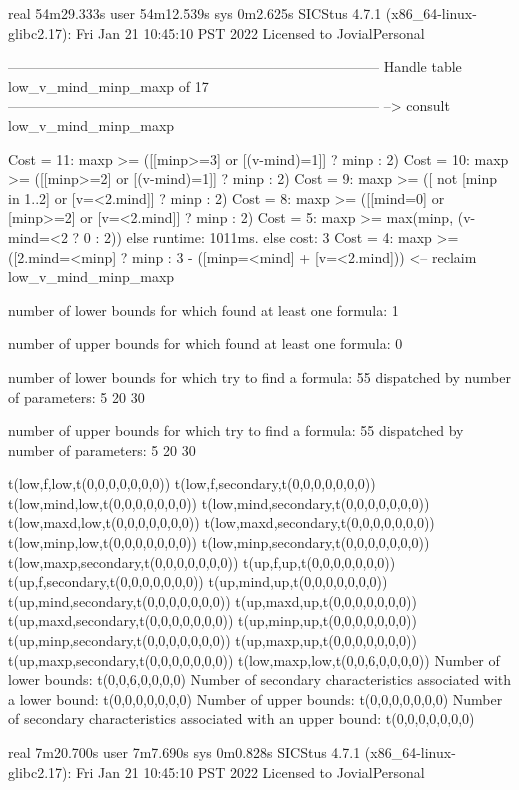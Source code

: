 real	54m29.333s
user	54m12.539s
sys	0m2.625s
SICStus 4.7.1 (x86_64-linux-glibc2.17): Fri Jan 21 10:45:10 PST 2022
Licensed to JovialPersonal


--------------------------------------------------------------------------------
Handle table low_v_mind_minp_maxp of 17
--------------------------------------------------------------------------------
--> consult low_v_mind_minp_maxp

Cost = 11:  maxp >= ([[minp>=3] or [(v-mind)=1]] ? minp : 2)
Cost = 10:  maxp >= ([[minp>=2] or [(v-mind)=1]] ? minp : 2)
Cost =  9:  maxp >= ([ not [minp in 1..2] or [v=<2.mind]] ? minp : 2)
Cost =  8:  maxp >= ([[mind=0] or [minp>=2] or [v=<2.mind]] ? minp : 2)
Cost =  5:  maxp >= max(minp, (v-mind=<2 ? 0 : 2)) %
else runtime: 1011ms. else cost: 3
Cost =  4:  maxp >= ([2.mind=<minp] ? minp : 3 - ([minp=<mind] + [v=<2.mind])) %
<-- reclaim low_v_mind_minp_maxp

number of lower bounds for which found at least one formula: 1

number of upper bounds for which found at least one formula: 0

number of lower bounds for which try to find a formula: 55
dispatched by number of parameters: 5  20  30

number of upper bounds for which try to find a formula: 55
dispatched by number of parameters: 5  20  30

t(low,f,low,t(0,0,0,0,0,0,0))
t(low,f,secondary,t(0,0,0,0,0,0,0))
t(low,mind,low,t(0,0,0,0,0,0,0))
t(low,mind,secondary,t(0,0,0,0,0,0,0))
t(low,maxd,low,t(0,0,0,0,0,0,0))
t(low,maxd,secondary,t(0,0,0,0,0,0,0))
t(low,minp,low,t(0,0,0,0,0,0,0))
t(low,minp,secondary,t(0,0,0,0,0,0,0))
t(low,maxp,secondary,t(0,0,0,0,0,0,0))
t(up,f,up,t(0,0,0,0,0,0,0))
t(up,f,secondary,t(0,0,0,0,0,0,0))
t(up,mind,up,t(0,0,0,0,0,0,0))
t(up,mind,secondary,t(0,0,0,0,0,0,0))
t(up,maxd,up,t(0,0,0,0,0,0,0))
t(up,maxd,secondary,t(0,0,0,0,0,0,0))
t(up,minp,up,t(0,0,0,0,0,0,0))
t(up,minp,secondary,t(0,0,0,0,0,0,0))
t(up,maxp,up,t(0,0,0,0,0,0,0))
t(up,maxp,secondary,t(0,0,0,0,0,0,0))
t(low,maxp,low,t(0,0,6,0,0,0,0))
Number of lower bounds:                                             t(0,0,6,0,0,0,0)
Number of secondary characteristics associated with a lower bound:  t(0,0,0,0,0,0,0)
Number of upper bounds:                                             t(0,0,0,0,0,0,0)
Number of secondary characteristics associated with an upper bound: t(0,0,0,0,0,0,0)

real	7m20.700s
user	7m7.690s
sys	0m0.828s
SICStus 4.7.1 (x86_64-linux-glibc2.17): Fri Jan 21 10:45:10 PST 2022
Licensed to JovialPersonal


